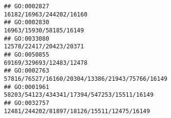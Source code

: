 \documentclass[
]{article}
\begin{document}
\begin{verbatim}
## GO:0002827                                                                                                                                                                                                                                                                                                                                                                                     16182/16963/244202/16160
## GO:0002830                                                                                                                                                                                                                                                                                                                                                                                      16963/15930/58185/16149
## GO:0033080                                                                                                                                                                                                                                                                                                                                                                                      12578/22417/20423/20371
## GO:0050855                                                                                                                                                                                                                                                                                                                                                                                     69169/329693/12483/12478
## GO:0002763                                                                                                                                                                                                                                                                                                                                                              57816/76527/16160/20304/13386/21943/75766/16149
## GO:0001961                                                                                                                                                                                                                                                                                                                                                                  58203/54123/434341/17394/547253/15511/16149
## GO:0032757                                                                                                                                                                                                                                                                                                                                                                   12481/244202/81897/18126/15511/12475/16149

\end{verbatim}
\end{document}
